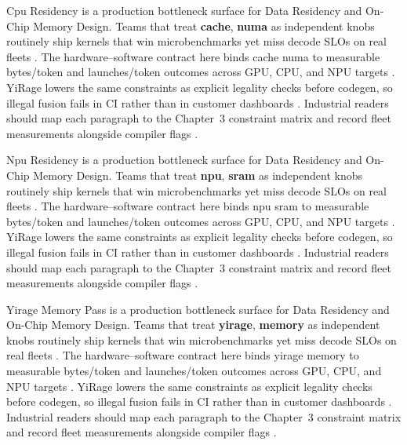 Cpu Residency is a production bottleneck surface for Data Residency and On-Chip Memory Design. Teams that treat \textbf{cache}, \textbf{numa} as independent knobs routinely ship kernels that win microbenchmarks yet miss decode SLOs on real fleets \citep{semianalysis2024tma,dlbook}. The hardware--software contract here binds cache numa to measurable bytes/token and launches/token outcomes across GPU, CPU, and NPU targets \citep{amd2024xdna,dao2022flashattention}. YiRage lowers the same constraints as explicit legality checks before codegen, so illegal fusion fails in CI rather than in customer dashboards \citep{amd2024aie,kwon2023vllm}. Industrial readers should map each paragraph to the Chapter~3 constraint matrix and record fleet measurements alongside compiler flags \citep{dlbook,nvidia2024cudagraphs}.

Npu Residency is a production bottleneck surface for Data Residency and On-Chip Memory Design. Teams that treat \textbf{npu}, \textbf{sram} as independent knobs routinely ship kernels that win microbenchmarks yet miss decode SLOs on real fleets \citep{amd2024xdna,dao2022flashattention}. The hardware--software contract here binds npu sram to measurable bytes/token and launches/token outcomes across GPU, CPU, and NPU targets \citep{amd2024aie,kwon2023vllm}. YiRage lowers the same constraints as explicit legality checks before codegen, so illegal fusion fails in CI rather than in customer dashboards \citep{dlbook,nvidia2024cudagraphs}. Industrial readers should map each paragraph to the Chapter~3 constraint matrix and record fleet measurements alongside compiler flags \citep{dao2022flashattention,liu2024deepseekv3}.

Yirage Memory Pass is a production bottleneck surface for Data Residency and On-Chip Memory Design. Teams that treat \textbf{yirage}, \textbf{memory} as independent knobs routinely ship kernels that win microbenchmarks yet miss decode SLOs on real fleets \citep{amd2024aie,kwon2023vllm}. The hardware--software contract here binds yirage memory to measurable bytes/token and launches/token outcomes across GPU, CPU, and NPU targets \citep{dlbook,nvidia2024cudagraphs}. YiRage lowers the same constraints as explicit legality checks before codegen, so illegal fusion fails in CI rather than in customer dashboards \citep{dao2022flashattention,liu2024deepseekv3}. Industrial readers should map each paragraph to the Chapter~3 constraint matrix and record fleet measurements alongside compiler flags \citep{kwon2023vllm,patel2025llminference}.

